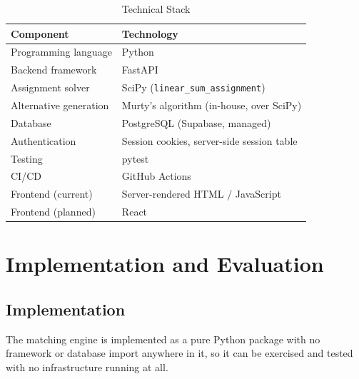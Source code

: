 \documentclass[11pt,a4paper]{report}
\begin{document}
\begin{table}[H]
\centering
\begin{tabular}{p{} p{}}
\toprule
\textbf{Component} & \textbf{Technology} \\
\midrule
Programming language & Python \\
Backend framework & FastAPI \\
Assignment solver & SciPy (\texttt{linear\_sum\_assignment}) \\
Alternative generation & Murty's algorithm (in-house, over SciPy) \\
Database & PostgreSQL (Supabase, managed) \\
Authentication & Session cookies, server-side session table \\
Testing & pytest \\
CI/CD & GitHub Actions \\
Frontend (current) & Server-rendered HTML / JavaScript \\
Frontend (planned) & React \\
\bottomrule
\end{tabular}
\caption{Technical Stack}
\label{tab:techstack}
\end{table}


\chapter{Implementation and Evaluation}

\section{Implementation}

The matching engine is implemented as a pure Python package with no
framework or database import anywhere in it, so it can be exercised
and tested with no infrastructure running at all.
\end{document}
